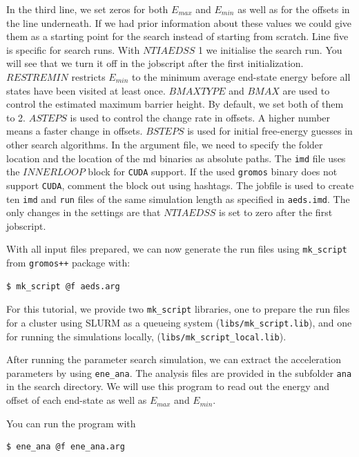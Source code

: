 In the third line, we set zeros for both $E_{max}$ and $E_{min}$ as well as for the offsets in the line underneath. If we had prior information about these values we could give them as a starting point for the search instead of starting from scratch. Line five is specific for search runs. With $NTIAEDSS$ 1 we initialise the search run. You will see that we turn it off in the jobscript after the first initialization. $RESTREMIN$ restricts $E_{min}$ to the minimum average end-state energy before all states have been visited at least once. $BMAXTYPE$ and $BMAX$ are used to control the estimated maximum barrier height. By default, we set both of them to 2. $ASTEPS$ is used to control the change rate in offsets. A higher number means a faster change in offsets. $BSTEPS$ is used for initial free-energy guesses in other search algorithms. In the argument file, we need to specify the folder location and the location of the md binaries as absolute paths. The \texttt{imd} file uses the $INNERLOOP$ block for \texttt{CUDA} support. If the used \texttt{gromos} binary does not support \texttt{CUDA}, comment the block out using hashtags. The jobfile is used to create ten \texttt{imd} and \texttt{run} files of the same simulation length as specified in \texttt{aeds.imd}. The only changes in the settings are that 
$NTIAEDSS$ is set to zero after the first jobscript.

With all input files prepared, we can now generate the run files using \texttt{mk\_script} from \texttt{gromos++} package with:
\begin{lstlisting}
$ mk_script @f aeds.arg
\end{lstlisting}

For this tutorial, we provide two \texttt{mk\_script} libraries, one to prepare the run files for a cluster using SLURM as a queueing system (\texttt{libs/mk\_script.lib}), and one for running the simulations locally, (\texttt{libs/mk\_script\_local.lib}).

After running the parameter search simulation, we can extract the acceleration parameters by using \texttt{ene\_ana}. The analysis files are provided in the subfolder \texttt{ana} in the search directory. 
We will use this program to read out the energy and offset of each end-state as well as $E_{max}$ and $E_{min}$. 

You can run the program with 
\begin{lstlisting}
$ ene_ana @f ene_ana.arg
\end{lstlisting}

